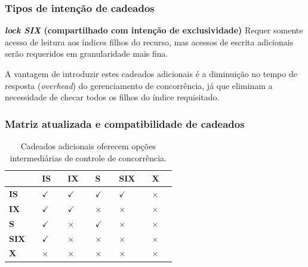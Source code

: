 \documentclass{beamer}
\begin{document}
\begin{frame} %
    \frametitle{Tipos de intenção de cadeados}

    \begin{block}{\textbf{\emph{lock SIX} (compartilhado com intenção de exclusividade)}}
        Requer somente acesso de leitura aos índices filhos do recurso, mas acessos de escrita adicionais serão requeridos em granularidade mais fina. 
    \end{block}
    
    \medskip
    \medskip
    A vantagem de introduzir estes cadeados adicionais é a diminuição no tempo de resposta (\emph{overhead}) do gerenciamento de concorrência, já que eliminam a necessidade de checar todos os filhos do índice requisitado.
    
\end{frame}
    
    
\begin{frame} %
    \frametitle{Matriz atualizada e compatibilidade de cadeados}

    \begin{table}
    \begin{tabular}{l l l l l l l l l l l l}
        \toprule

        \textbf{} && \textbf{IS} && \textbf{IX} && \textbf{S} && \textbf{SIX} && \textbf{X} \\

        \midrule

        \textbf{IS} && $\checkmark$ && $\checkmark$ && $\checkmark$ && $\checkmark$ && $\times$ \\
        \textbf{IX} && $\checkmark$ && $\checkmark$ && $\times$ && $\times$ && $\times$ \\
        \textbf{S} && $\checkmark$ && $\times$ && $\checkmark$ && $\times$ && $\times$ \\
        \textbf{SIX} && $\checkmark$ && $\times$ && $\times$ && $\times$ && $\times$ \\
        \textbf{X} && $\times$ && $\times$ && $\times$ && $\times$ && $\times$ \\

        \bottomrule
    \end{tabular}
    \caption{Cadeados adicionais oferecem opções intermediárias de controle de concorrência.}
    \end{table}
    
\end{frame}
\end{document}
